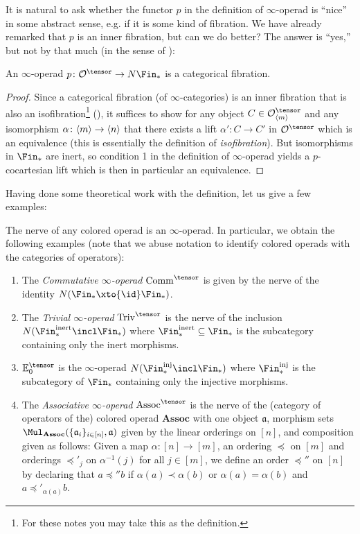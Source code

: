 \documentclass[topology]{bsteffan-notes}
\newcommand{\cO}{{\mathcal{O}}}
\newcommand{\fa}{{\mathfrak{a}}}
\DeclarePairedDelimiter{\FSn}{\langle}{\rangle}
\newcommand{\Comm}{\mathrm{Comm}}
\newcommand{\Triv}{\mathrm{Triv}}
\newcommand{\Assoc}{\mathrm{Assoc}}
\begin{document}
It is natural to ask whether the functor $p$ in the definition of $\infty$-operad is \enquote{nice} in some abstract sense, e.g. if it is some kind of fibration. 
We have already remarked that $p$ is an inner fibration, but can we do better?
The answer is \enquote{yes,} but not by that much (in the sense of \cite[Remark 2.0.0.5]{lurie_higher_2009}):
\begin{proposition}
	An $\infty$-operad $p\colon \cO^\tensor \to N\Fin_*$ is a categorical fibration.
\end{proposition}
\begin{proof}
	Since a categorical fibration (of $\infty$-categories) is an inner fibration that is also an isofibration\footnote{For these notes you may take this as the definition.} (\cite[Corollary 2.4.6.5]{lurie_higher_2009}), it suffices to show for any object $C \in \cO^\tensor_{\FSn{m}}$ and any isomorphism $\alpha\colon \FSn{m} \to \FSn{n}$ that there exists a lift $\alpha'\colon C \to C'$ in $\cO^\tensor$ which is an equivalence (this is essentially the definition of \emph{isofibration}). 
	But isomorphisms in $\Fin_*$ are inert, so condition 1 in the definition of $\infty$-operad yields a $p$-cocartesian lift which is then in particular an equivalence.
\end{proof}
Having done some theoretical work with the definition, let us give a few examples:
\begin{example}
	The nerve of any colored operad is an $\infty$-operad.
	In particular, we obtain the following examples (note that we abuse notation to identify colored operads with the categories of operators):
	\begin{enumerate}
		\item The \emph{Commutative $\infty$-operad} $\Comm^\tensor$ is given by the nerve of the identity $N(\Fin_* \xto{\id} \Fin_*)$.
		\item The \emph{Trivial $\infty$-operad} $\Triv^\tensor$ is the nerve of the inclusion $N(\Fin_*^\mathrm{inert} \incl \Fin_*)$ where $\Fin_*^\mathrm{inert} \subseteq \Fin_*$ is the subcategory containing only the inert morphisms.
		\item $\mathbb{E}_0^\tensor$ is the $\infty$-operad $N(\Fin^{\mathrm{inj}}_* \incl \Fin_*)$ where $\Fin^{\mathrm{inj}}_*$ is the subcategory of $\Fin_*$ containing only the injective morphisms.
		\item The \emph{Associative $\infty$-operad} $\Assoc^\tensor$ is the nerve of the (category of operators of the) colored operad $\mathbf{Assoc}$ with one object $\fa$, morphism sets $\Mul_{\mathbf{Assoc}}(\{\fa_i\}_{i \in [n]}, \fa)$ given by the linear orderings on $[n]$, and composition given as follows:
			Given a map $\alpha\colon [n] \to [m]$, an ordering $\preceq$ on $[m]$ and orderings $\preceq'_j$ on $\alpha^{-1}(j)$ for all $j \in [m]$, we define an order $\preceq''$ on $[n]$ by declaring that $a \preceq'' b$ if $\alpha(a) \prec \alpha(b)$ or $\alpha(a) = \alpha(b)$ and $a \preceq'_{\alpha(a)} b$.
	\end{enumerate}
\end{example}
\end{document}

